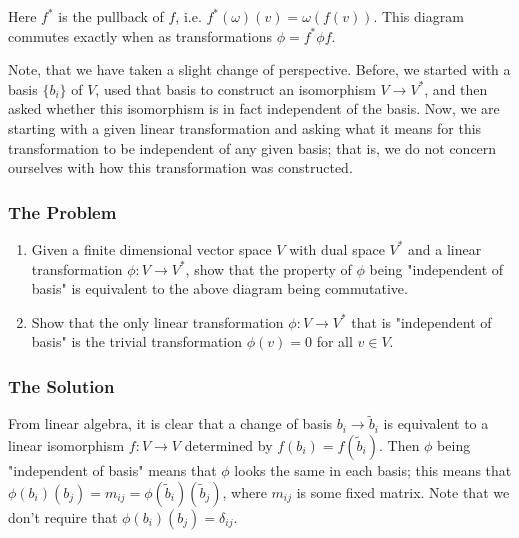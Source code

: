 \begin{figure}[h]
\centering
{}
\end{figure}
Here \(f^*\) is the pullback of \(f\), i.e. \(f^*(\omega)(v) = \omega(f(v))\). This diagram commutes exactly when as transformations \(\phi = f^* \phi f\).

Note, that we have taken a slight change of perspective. Before, we started with a basis \(\{b_i\}\) of \(V\), used that basis to construct an isomorphism \(V \to V^*\), and then asked whether
this isomorphism is in fact independent of the basis. Now, we are starting with a given linear transformation and asking what it means for this transformation to be independent of any given
basis; that is, we do not concern ourselves with how this transformation was constructed.

\subsubsection*{The Problem}

\begin{enumerate}
\item Given a finite dimensional vector space \(V\) with dual space \(V^*\) and a linear transformation \(\phi: V \to V^*\), show that the property of \(\phi\) being "independent of basis"
is equivalent to the above diagram being commutative.
\item Show that the only linear transformation \(\phi: V \to V^*\) that is "independent of basis" is the trivial transformation \(\phi(v) = 0\) for all \(v \in V\).
\end{enumerate}

\subsubsection*{The Solution}

From linear algebra, it is clear that a change of basis \(b_i \to \tilde b_i\) is equivalent to a linear isomorphism \(f : V \to  V\) determined by \(f(b_i) = f(\tilde b_i)\).
Then \(\phi\) being "independent of basis" means that \(\phi\) looks the same in each basis; this means that \(\phi(b_i)(b_j) = m_{ij} = \phi(\tilde b_i)(\tilde b_j)\), where \(m_{ij}\)
is some fixed matrix. Note that we don't require that \(\phi(b_i)(b_j) = \delta_{ij}\).

